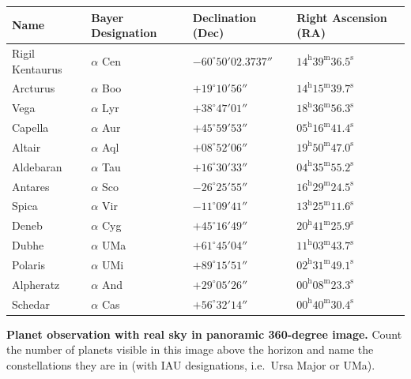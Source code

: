 \begin{description}
  \begin{center}
  \begin{tabular}{llll}
  Name & Bayer Designation & Declination (Dec) & Right Ascension (RA) \\
  \hline
  Rigil Kentaurus & $\alpha$ Cen & $-60^\circ 50' 02.3737''$
    & $14^{\mathrm{h}}39^{\mathrm{m}}36.5^{\mathrm{s}}$ \\
  Arcturus & $\alpha$ Boo & $+19^\circ 10' 56''$
    & $14^{\mathrm{h}}15^{\mathrm{m}}39.7^{\mathrm{s}}$ \\
  Vega & $\alpha$ Lyr & $+38^\circ 47' 01''$
    & $18^{\mathrm{h}}36^{\mathrm{m}}56.3^{\mathrm{s}}$ \\
  Capella & $\alpha$ Aur & $+45^\circ 59' 53''$
    & $05^{\mathrm{h}}16^{\mathrm{m}}41.4^{\mathrm{s}}$ \\
  Altair & $\alpha$ Aql & $+08^\circ 52' 06''$
    & $19^{\mathrm{h}}50^{\mathrm{m}}47.0^{\mathrm{s}}$ \\
  Aldebaran & $\alpha$ Tau & $+16^\circ 30' 33''$
    & $04^{\mathrm{h}}35^{\mathrm{m}}55.2^{\mathrm{s}}$ \\
  Antares & $\alpha$ Sco & $-26^\circ 25' 55''$
    & $16^{\mathrm{h}}29^{\mathrm{m}}24.5^{\mathrm{s}}$ \\
  Spica & $\alpha$ Vir & $-11^\circ 09' 41''$
    & $13^{\mathrm{h}}25^{\mathrm{m}}11.6^{\mathrm{s}}$ \\
  Deneb & $\alpha$ Cyg & $+45^\circ 16' 49''$
    & $20^{\mathrm{h}}41^{\mathrm{m}}25.9^{\mathrm{s}}$ \\
  Dubhe & $\alpha$ UMa & $+61^\circ 45' 04''$
    & $11^{\mathrm{h}}03^{\mathrm{m}}43.7^{\mathrm{s}}$ \\
  Polaris & $\alpha$ UMi & $+89^\circ 15' 51''$
    & $02^{\mathrm{h}}31^{\mathrm{m}}49.1^{\mathrm{s}}$ \\
  Alpheratz & $\alpha$ And & $+29^\circ 05' 26''$
    & $00^{\mathrm{h}}08^{\mathrm{m}}23.3^{\mathrm{s}}$ \\
  Schedar & $\alpha$ Cas & $+56^\circ 32' 14''$
    & $00^{\mathrm{h}}40^{\mathrm{m}}30.4^{\mathrm{s}}$ \\
  \end{tabular}
  \end{center}

\item[(P2)] \textbf{Planet observation with real sky in panoramic 360-degree
  image.} Count the number of planets visible in this image above the horizon
  and name the constellations they are in (with IAU designations, i.e.\ Ursa
  Major or UMa).


\end{description}
